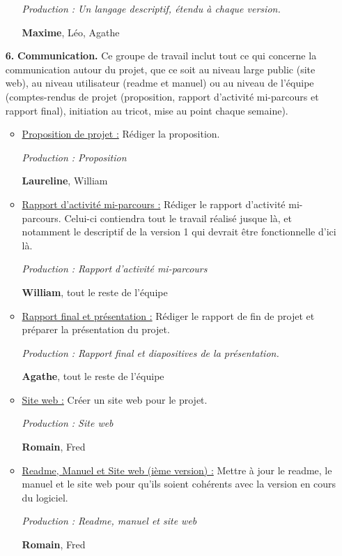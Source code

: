 \documentclass{article}
\begin{document}
\begin{itemize}
\begin{itemize}
    \textit{Production : Un langage descriptif, étendu à chaque version.}

    \textbf{Maxime}, Léo, Agathe

  \end{itemize}

\medskip

\item[\textbf{6.}] \textbf{Communication.} Ce groupe de travail inclut tout ce qui concerne la communication autour du projet, que ce soit au niveau
large public (site web), au niveau utilisateur (readme et manuel) ou au niveau de l'équipe (comptes-rendus de projet (proposition, rapport
d'activité mi-parcours et rapport final), initiation au tricot, mise au point chaque semaine).


  \begin{itemize}
    \item \underline{Proposition de projet :} Rédiger la proposition.

    \textit{Production : Proposition}

    \textbf{Laureline}, William

    \item \underline{Rapport d'activité mi-parcours :} Rédiger le rapport d'activité mi-parcours. Celui-ci contiendra tout le travail réalisé jusque là,
et notamment le descriptif de la version 1 qui devrait être fonctionnelle d'ici là.

    \textit{Production : Rapport d'activité mi-parcours}

    \textbf{William}, tout le reste de l'équipe

    \item \underline{Rapport final et présentation :} Rédiger le rapport de fin de projet et préparer la présentation du projet.

    \textit{Production : Rapport final et diapositives de la présentation.}

    \textbf{Agathe}, tout le reste de l'équipe

    \item \underline{Site web :} Créer un site web pour le projet. %

    \textit{Production : Site web}

    \textbf{Romain}, Fred

    \item \underline{Readme, Manuel et Site web (ième version) :} Mettre à jour le readme, le manuel et le site web pour qu'ils soient cohérents avec la
version en cours du logiciel.

    \textit{Production : Readme, manuel et site web}

    \textbf{Romain}, Fred
  \end{itemize}

\medskip

\end{itemize}
\end{document}
